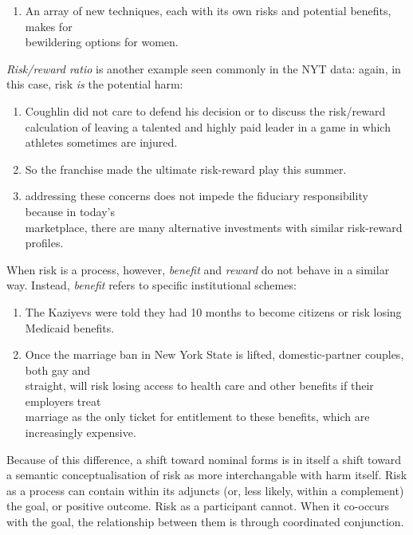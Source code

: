 \begin{enumerate} [before=\color{black}\ttfamily] \setlength\itemsep{0em} \small\item An array of new techniques, each with its own risks and potential benefits, makes for \\ bewildering options for women.
\end{enumerate}
%
\emph{Risk/reward ratio} is another example seen commonly in the NYT data: again, in this case, risk \emph{is} the potential harm:
%
\begin{enumerate} [before=\color{black}\ttfamily] \setlength\itemsep{0em} \small\item Coughlin did not care to defend his decision or to discuss the  risk\slash reward calculation of leaving a talented and highly paid leader in a game in which athletes sometimes are injured.\item So the franchise made the ultimate risk-reward play this summer.\item addressing these concerns does not impede the fiduciary responsibility because in today's \\ marketplace, there are many alternative investments with similar risk-reward profiles.
\end{enumerate}
%
When risk is a process, however, \emph{benefit} and \emph{reward} do not behave in a similar way. Instead, \emph{benefit} refers to specific institutional schemes:
%
\begin{enumerate} [before=\color{black}\ttfamily] \setlength\itemsep{0em} \small\item The Kaziyevs were told they had 10 months to become citizens or risk losing Medicaid benefits.\item Once the marriage ban in New York State is lifted, domestic-partner couples, both gay and \\ straight, will risk losing access to health care and other benefits if their employers treat \\ marriage as the only ticket for entitlement to these benefits, which are increasingly expensive.
\end{enumerate}
%
Because of this difference, a shift toward nominal forms is in itself a shift toward a semantic conceptualisation of risk as more interchangable with harm itself. Risk as a process can contain within its adjuncts (or, less likely, within a complement) the goal, or positive outcome. Risk as a participant cannot. When it co-occurs with the goal, the relationship between them is through coordinated conjunction.

